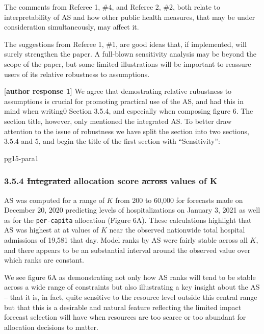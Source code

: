 \documentclass{article}
\providecommand{\DIFaddtex}[1]{{\protect\color{blue}\uwave{#1}}} %
\providecommand{\DIFdeltex}[1]{{\protect\color{red}\sout{#1}}}                      %
\providecommand{\DIFaddbegin}{} %
\providecommand{\DIFaddend}{} %
\providecommand{\DIFdelbegin}{} %
\providecommand{\DIFdelend}{} %
\providecommand{\DIFadd}[1]{\texorpdfstring{\DIFaddtex{#1}}{#1}} %
\providecommand{\DIFdel}[1]{\texorpdfstring{\DIFdeltex{#1}}{}} %
\newcommand{\DIFscaledelfig}{0.5}
\newlength{\DIFdelgraphicswidth} %
\newlength{\DIFdelgraphicsheight} %
\newcommand{\DIFaddincludegraphics}[2][]{{\color{blue}\fbox{\DIFOincludegraphics[#1]{#2}}}} %
\newcommand{\DIFdelincludegraphics}[2][]{%
\sbox{\DIFdelgraphicsbox}{\DIFOincludegraphics[#1]{#2}}%
\settoboxwidth{\DIFdelgraphicswidth}{\DIFdelgraphicsbox} %
\settoboxtotalheight{\DIFdelgraphicsheight}{\DIFdelgraphicsbox} %
\scalebox{\DIFscaledelfig}{%
\parbox[b]{\DIFdelgraphicswidth}{\usebox{\DIFdelgraphicsbox}\\[-\baselineskip] \rule{\DIFdelgraphicswidth}{0em}}\llap{\resizebox{\DIFdelgraphicswidth}{\DIFdelgraphicsheight}{%
\setlength{\unitlength}{\DIFdelgraphicswidth}%
\begin{picture}(1,1)%
\thicklines\linethickness{2pt} %
{\color[rgb]{1,0,0}\put(0,0){\framebox(1,1){}}}%
{\color[rgb]{1,0,0}\put(0,0){\line( 1,1){1}}}%
{\color[rgb]{1,0,0}\put(0,1){\line(1,-1){1}}}%
\end{picture}%
}\hspace*{3pt}}} %
} %
\DeclareRobustCommand{\DIFaddbegin}{\DIFOaddbegin \let\includegraphics\DIFaddincludegraphics} %
\DeclareRobustCommand{\DIFaddend}{\DIFOaddend \let\includegraphics\DIFOincludegraphics} %
\DeclareRobustCommand{\DIFdelbegin}{\DIFOdelbegin \let\includegraphics\DIFdelincludegraphics} %
\DeclareRobustCommand{\DIFdelend}{\DIFOaddend \let\includegraphics\DIFOincludegraphics} %
\begin{document}
\begin{quotebar}
The comments from Referee 1, \#4, and Referee 2, \#2, both relate to
interpretability of AS and how other public health measures, that may
be under consideration simultaneously, may affect it.
 
The suggestions from Referee 1, \#1, are good ideas that, if implemented,
will surely strengthen the paper. A full-blown sensitivity analysis may
be beyond the scope of the paper, but some limited illustrations will
be important to reassure users of its relative robustness to assumptions.  
\end{quotebar}

[\textbf{author response 1}] We agree that demostrating relative rubustness to assumptions is crucial for promoting practical use of the AS, and had this in mind when writing0
Section 3.5.4, and especially when composing figure 6.  The section title, however, only mentioned the integrated AS. To better draw attention to
the issue of robustness we have split the section into two sections, 3.5.4 and 5,
and begin the title of the first section with ``Sensitivity'':

\begin{mybox}{pg15-para1}
  \subsubsection*{3.5.4 \quad \DIFdelbegin \DIFdel{Integrated }\DIFdelend \DIFaddbegin \DIFadd{Sensitivity of }\DIFaddend allocation score \DIFdelbegin \DIFdel{across }\DIFdelend \DIFaddbegin \DIFadd{to }\DIFaddend values of K}
  \DIFdelbegin %
  \DIFdelend \DIFaddbegin \label{sec:sensitivity}
  \DIFaddend 
AS was computed for a range of $K$ from 200 to 60,000 \DIFaddbegin \DIFadd{at increments of 200 }\DIFaddend for forecasts made on December 20, 2020 predicting levels of
hospitalizations on January 3, 2021 as well as for the \texttt{per-capita} allocation (Figure 6A). These
calculations highlight that AS was highest at at values of $K$ near the observed nationwide total hospital admissions of
19,581 that day. Model ranks by AS were fairly stable across all $K$, and there appears
to be an substantial interval around the observed value over which ranks are constant.

\end{mybox}

We see figure 6A as demonstrating not only how AS ranks will tend to be stable across a wide range of constraints but 
also illustrating a key insight about the AS -- that it is,
in fact, quite sensitive to the resource level outside this central range but that this is a desirable and
natural feature reflecting the limited impact forecast selection will have when
resources are too scarce or too abundant for allocation decisions to matter.
\end{document}
